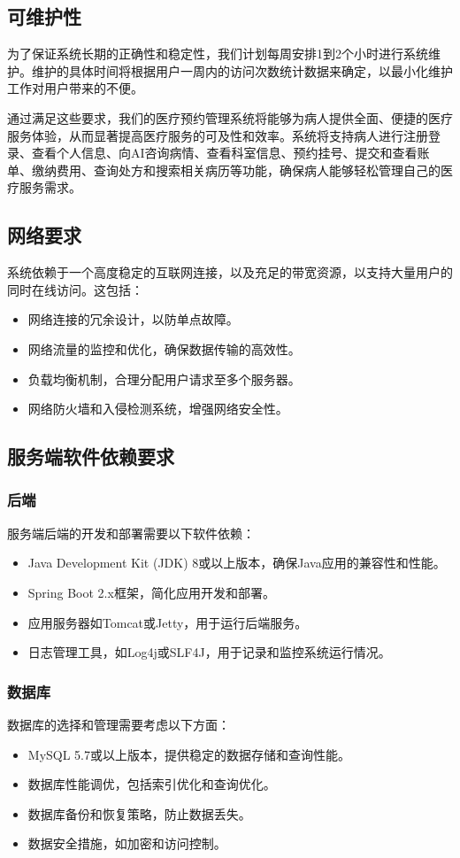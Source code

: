 \subsection{可维护性}
为了保证系统长期的正确性和稳定性，我们计划每周安排1到2个小时进行系统维护。维护的具体时间将根据用户一周内的访问次数统计数据来确定，以最小化维护工作对用户带来的不便。

通过满足这些要求，我们的医疗预约管理系统将能够为病人提供全面、便捷的医疗服务体验，从而显著提高医疗服务的可及性和效率。系统将支持病人进行注册登录、查看个人信息、向AI咨询病情、查看科室信息、预约挂号、提交和查看账单、缴纳费用、查询处方和搜索相关病历等功能，确保病人能够轻松管理自己的医疗服务需求。

\subsection{网络要求}
系统依赖于一个高度稳定的互联网连接，以及充足的带宽资源，以支持大量用户的同时在线访问。这包括：
\begin{itemize}
	\item 网络连接的冗余设计，以防单点故障。
	\item 网络流量的监控和优化，确保数据传输的高效性。
	\item 负载均衡机制，合理分配用户请求至多个服务器。
	\item 网络防火墙和入侵检测系统，增强网络安全性。
\end{itemize}

\subsection{服务端软件依赖要求}
\subsubsection{后端}
服务端后端的开发和部署需要以下软件依赖：
\begin{itemize}
	\item Java Development Kit (JDK) 8或以上版本，确保Java应用的兼容性和性能。
	\item Spring Boot 2.x框架，简化应用开发和部署。
	\item 应用服务器如Tomcat或Jetty，用于运行后端服务。
	\item 日志管理工具，如Log4j或SLF4J，用于记录和监控系统运行情况。
\end{itemize}

\subsubsection{数据库}
数据库的选择和管理需要考虑以下方面：
\begin{itemize}
	\item MySQL 5.7或以上版本，提供稳定的数据存储和查询性能。
	\item 数据库性能调优，包括索引优化和查询优化。
	\item 数据库备份和恢复策略，防止数据丢失。
	\item 数据安全措施，如加密和访问控制。
\end{itemize}

